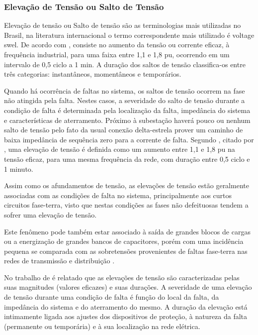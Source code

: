 \subsubsection{Elevação de Tensão ou Salto de Tensão}
\par
Elevação de tensão ou Salto de tensão são as terminologias mais utilizadas no Brasil, na literatura internacional o termo correspondente mais utilizado é voltage swel. De acordo com \cite{FER99}, consiste no aumento da tensão ou corrente eficaz, à frequência industrial, para uma faixa entre 1,1 e 1,8 pu, ocorrendo em um intervalo de 0,5 ciclo a 1 min. A duração dos saltos de tensão classifica-os entre três categorias: instantâneos, momentâneos e temporários.
\par
Quando há ocorrência de faltas no sistema, os saltos de tensão ocorrem na fase não atingida pela falta. Nestes casos, a severidade do salto de tensão durante a condição de falta é determinada pela localização da falta, impedância do sistema e características de aterramento. Próximo à subestação haverá pouco ou nenhum salto de tensão pelo fato da usual conexão delta-estrela prover um caminho de baixa impedância de sequência zero para a corrente de falta. Segundo \cite{OLIVE}, citado por \cite{DEL03}, uma elevação de tensão é definida como um aumento entre 1,1 e 1,8 pu na tensão eficaz, para uma mesma frequência da rede, com duração entre 0,5 ciclo e 1 minuto.
\par
Assim como os afundamentos de tensão, as elevações de tensão estão geralmente associadas com as condições de falta no sistema, principalmente aos curtos circuitos fase-terra, visto que nestas condições as fases não defeituosas tendem a sofrer uma elevação de tensão.
\par
Este fenômeno pode também estar associado à saída de grandes blocos de cargas ou a energização de grandes bancos de capacitores, porém com uma incidência pequena se comparada com as sobretensões provenientes de faltas fase-terra nas redes de transmissão e distribuição \cite{DUG96}.
\par
No trabalho de \cite{DEL03} é relatado que as elevações de tensão são caracterizadas pelas suas magnitudes (valores eficazes) e suas durações. A severidade de uma elevação de tensão durante uma condição de falta é função do local da falta, da impedância do sistema e do aterramento do mesmo. A duração da elevação está intimamente ligada aos ajustes dos dispositivos de proteção, à natureza da falta (permanente ou temporária) e à sua localização na rede elétrica.
\par
